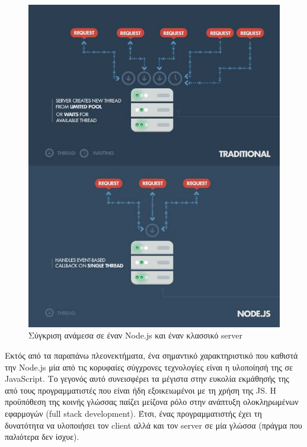 \begin{figure}[ht]
    \centering
    \includegraphics[scale=0.8]{figures/node-vs-tradinional-web-server.png}
    \caption{Σύγκριση ανάμεσα σε έναν Node.js και έναν κλασσικό server}
    \label{nodevstraditional}
\end{figure}

Εκτός από τα παραπάνω πλεονεκτήματα, ένα σημαντικό χαρακτηριστικό που καθιστά την Node.js μία από τις κορυφαίες σύγχρονες τεχνολογίες είναι η υλοποίησή της σε JavaScript. Το γεγονός αυτό συνεισφέρει τα μέγιστα στην ευκολία εκμάθησής της από τους προγραμματιστές που είναι ήδη εξοικειωμένοι με τη χρήση της JS. Η προϋπόθεση της κοινής γλώσσας παίζει μείζονα ρόλο στην ανάπτυξη ολοκληρωμένων εφαρμογών (full stack development). Έτσι, ένας προγραμματιστής έχει τη δυνατότητα να υλοποιήσει τον client αλλά και τον server σε μία γλώσσα (πράγμα που παλιότερα δεν ίσχυε).

